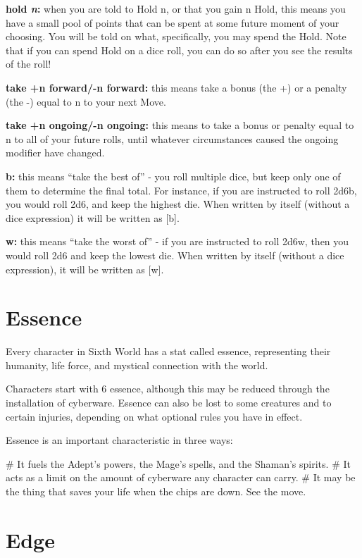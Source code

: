 \textbf{hold \textit{n}:} when you are told to Hold n, or that you gain n Hold, this means you have a small pool of points that can be spent at some future moment of your choosing. You will be told on what, specifically, you may spend the Hold. Note that if you can spend Hold on a dice roll, you can do so after you see the results of the roll!

\textbf{take +n forward/-n forward:} this means take a bonus (the +) or a penalty (the -) equal to n to your next Move.

\textbf{take +n ongoing/-n ongoing:} this means to take a bonus or penalty equal to n to all of your future rolls, until whatever circumstances caused the ongoing modifier have changed.

\textbf{b:} this means ``take the best of'' - you roll multiple dice, but keep only one of them to determine the final total. For instance, if you are instructed to roll 2d6b, you would roll 2d6, and keep the highest die. When written by itself (without a dice expression) it will be written as [b].

\textbf{w:} this means ``take the worst of'' - if you are instructed to roll 2d6w, then you would roll 2d6 and keep the lowest die. When written by itself (without a dice expression), it will be written as [w].


\section{Essence}

Every character in Sixth World has a stat called essence, representing their humanity, life force, and mystical connection with the world.

Characters start with 6 essence, although this may be reduced through the installation of cyberware. Essence can also be lost to some creatures and to certain injuries, depending on what optional rules you have in effect.

Essence is an important characteristic in three ways:

\begin{easylist}
    # It fuels the Adept’s powers, the Mage’s spells, and the Shaman’s spirits.
    # It acts as a limit on the amount of cyberware any character can carry.
    # It may be the thing that saves your life when the chips are down. See the  move.
\end{easylist}


\section{Edge}

